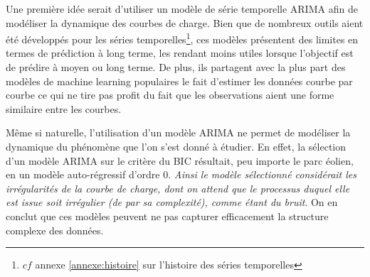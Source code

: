 Une première idée serait d'utiliser un modèle de série temporelle ARIMA afin de modéliser la dynamique des courbes de charge. Bien que de nombreux outils aient été développés pour les séries temporelles\footnote{$cf$ annexe \ref{annexe:histoire} sur l'histoire des séries temporelles}, ces modèles présentent des limites en termes de prédiction à long terme, les rendant moins utiles lorsque l'objectif est de prédire à moyen ou long terme. De plus, ils partagent avec la plus part des modèles de machine learning populaires le fait d'estimer les données courbe par courbe ce qui ne tire pas profit du fait que les observations aient une forme similaire entre les courbes.

\smallskip

Même si naturelle, l'utilisation d'un modèle ARIMA ne permet de modéliser la dynamique du phénomène que l'on s'est donné à étudier. En effet, la sélection d'un modèle ARIMA sur le critère du BIC résultait, peu importe le parc éolien, en un modèle auto-régressif d'ordre 0. \emph{Ainsi le modèle sélectionné considérait les irrégularités de la courbe de charge, dont on attend que le processus duquel elle est issue soit irrégulier (de par sa complexité), comme étant du bruit}. On en conclut que ces modèles peuvent ne pas capturer efficacement la structure complexe des données.

\bigskip

\noindent
{}
